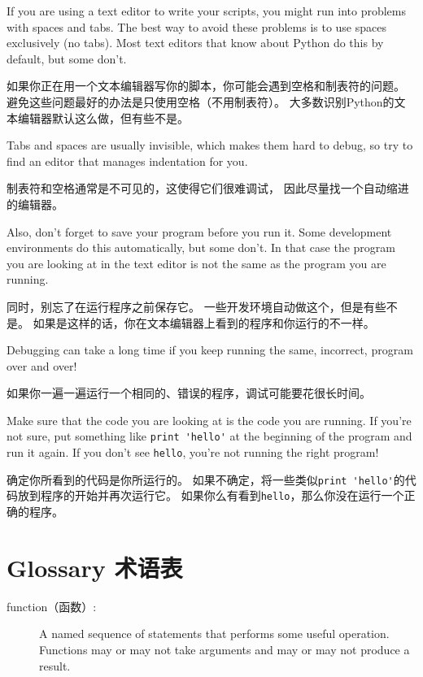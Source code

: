 \documentclass[10pt]{book}
\begin{document}
\begin{CJK}{UTF8}{gbsn}
If you are using a text editor to write your scripts, you might
run into problems with spaces and tabs.  The best way to avoid
these problems is to use spaces exclusively (no tabs).  Most text
editors that know about Python do this by default, but some
don't.

如果你正在用一个文本编辑器写你的脚本，你可能会遇到空格和制表符的问题。
避免这些问题最好的办法是只使用空格（不用制表符）。
大多数识别Python的文本编辑器默认这么做，但有些不是。

Tabs and spaces are usually invisible, which makes them
hard to debug, so try to find an editor that manages indentation
for you.

制表符和空格通常是不可见的，这使得它们很难调试，
因此尽量找一个自动缩进的编辑器。

Also, don't forget to save your program before you run it.  Some
development environments do this automatically, but some don't.
In that case the program you are looking at in the text editor
is not the same as the program you are running.

同时，别忘了在运行程序之前保存它。
一些开发环境自动做这个，但是有些不是。
如果是这样的话，你在文本编辑器上看到的程序和你运行的不一样。

Debugging can take a long time if you keep running the same,
incorrect, program over and over!

如果你一遍一遍运行一个相同的、错误的程序，调试可能要花很长时间。

Make sure that the code you are looking at is the code you are running.
If you're not sure, put something like \verb"print 'hello'" at the
beginning of the program and run it again.  If you don't see
\verb"hello", you're not running the right program!

确定你所看到的代码是你所运行的。
如果不确定，将一些类似\verb"print 'hello'"的代码放到程序的开始并再次运行它。
如果你么有看到\verb"hello"，那么你没在运行一个正确的程序。


\section{Glossary 术语表}

\begin{description}

\item[function（函数）:] A named sequence of statements that performs some
useful operation.  Functions may or may not take arguments and may or
may not produce a result.


\end{description}
\end{CJK}
\end{document}
